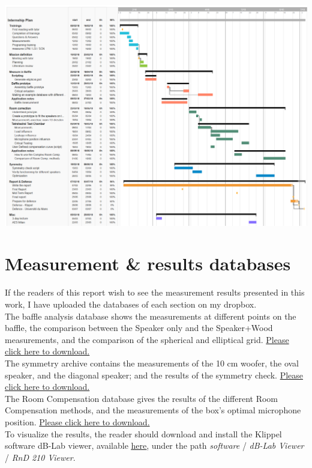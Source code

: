 \documentclass{report}
\begin{document}
\begin{appendices}
\begin{center}
	\includegraphics[width=\textwidth]{Appendix/Plan1} 
\end{center}


\chapter{Measurement \& results databases}

If the readers of this report wish to see the measurement results presented in this work, I have uploaded the databases of each section on my dropbox. \\
The baffle analysis database shows the measurements at different points on the baffle, the comparison between the Speaker only and the Speaker+Wood measurements, and the comparison of the spherical and elliptical grid. \href{https://www.dropbox.com/s/we7o95gzfl58f5d/Baffle_Measurements.kdbx?dl=0}{Please click \underline{here} to download.} \\

The symmetry archive contains the measurements of the 10 cm woofer, the oval speaker, and the diagonal speaker; and the results of the symmetry check.  \href{https://www.dropbox.com/s/zyhlq3nanyxap8a/Symmetry_Check.zip?dl=0}{Please click \underline{here} to download.}  \\

The Room Compensation database gives the results of the different Room Compensation methods, and the measurements of the box's optimal microphone position. \href{https://www.dropbox.com/s/0xq1em9ftyg0ncr/Room_Compensation.kdbx?dl=0}{Please click \underline{here} to download.} \\

To visualize the results, the reader should download and install the Klippel software dB-Lab viewer, available \href{https://www.klippel.de/dm/}{\underline{here}}, under the path \textit{software} /  \textit{dB-Lab Viewer} / \textit{RnD 210 Viewer}.


\end{appendices}
\end{document}
